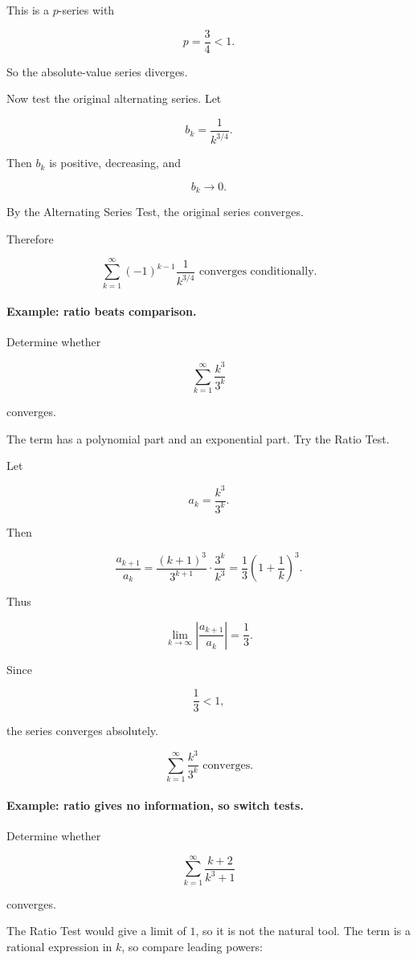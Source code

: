 This is a \(p\)-series with

\[
p=\frac34<1.
\]

So the absolute-value series diverges.

Now test the original alternating series.  Let

\[
b_k=\frac1{k^{3/4}}.
\]

Then \(b_k\) is positive, decreasing, and

\[
b_k\to0.
\]

By the Alternating Series Test, the original series converges.

Therefore

\[
\boxed{
\sum_{k=1}^{\infty}(-1)^{k-1}\frac1{k^{3/4}}
\text{ converges conditionally.}
}
\]

\paragraph{Example: ratio beats comparison.}
Determine whether

\[
\sum_{k=1}^{\infty}\frac{k^3}{3^k}
\]

converges.

The term has a polynomial part and an exponential part.  Try the Ratio Test.

Let

\[
a_k=\frac{k^3}{3^k}.
\]

Then

\[
\frac{a_{k+1}}{a_k}
=
\frac{(k+1)^3}{3^{k+1}}\cdot\frac{3^k}{k^3}
=
\frac13\left(1+\frac1k\right)^3.
\]

Thus

\[
\lim_{k\to\infty}\left|\frac{a_{k+1}}{a_k}\right|
=
\frac13.
\]

Since

\[
\frac13<1,
\]

the series converges absolutely.

\[
\boxed{
\sum_{k=1}^{\infty}\frac{k^3}{3^k}
\text{ converges.}
}
\]

\paragraph{Example: ratio gives no information, so switch tests.}
Determine whether

\[
\sum_{k=1}^{\infty}\frac{k+2}{k^3+1}
\]

converges.

The Ratio Test would give a limit of \(1\), so it is not the natural tool.  The term is a
rational expression in \(k\), so compare leading powers:


